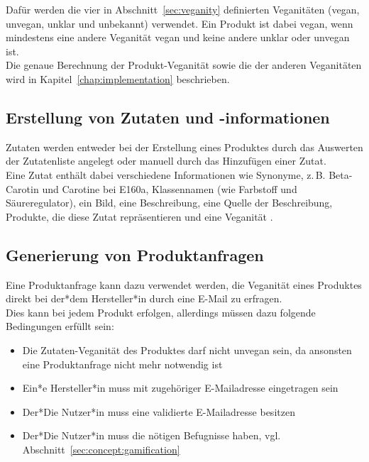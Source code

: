 Dafür werden die vier in Abschnitt~\ref{sec:veganity} definierten Veganitäten 
(vegan, unvegan, unklar und unbekannt) verwendet. Ein Produkt ist dabei vegan, 
wenn mindestens eine andere Veganität vegan und keine andere unklar oder 
unvegan ist.\\
Die genaue Berechnung der Produkt-Veganität sowie die der anderen Veganitäten 
wird in Kapitel~\ref{chap:implementation} beschrieben.

\subsection{Erstellung von Zutaten und -informationen}
\label{sec:concept:ingredients}

Zutaten werden entweder bei der Erstellung eines Produktes durch das
Auswerten der Zutatenliste angelegt oder manuell durch das Hinzufügen
einer Zutat.\\
Eine Zutat enthält dabei verschiedene Informationen wie Synonyme,
z.\,B. Beta-Carotin und Carotine bei E160a,
Klassennamen (wie Farbstoff und Säureregulator), ein Bild, eine
Beschreibung, eine Quelle der Beschreibung, Produkte, die diese Zutat
repräsentieren und eine Veganität .\\

\subsection{Generierung von Produktanfragen}
\label{sec:concept:inquiries}

Eine Produktanfrage kann dazu verwendet werden, die Veganität eines
Produktes direkt bei der*dem Hersteller*in durch eine E-Mail zu erfragen.\\
Dies kann bei jedem Produkt erfolgen, allerdings müssen dazu folgende Bedingungen
erfüllt sein:

\begin{itemize}
  \item Die Zutaten-Veganität des Produktes darf nicht unvegan sein, da ansonsten eine Produktanfrage nicht mehr notwendig ist
  \item Ein*e Hersteller*in muss mit zugehöriger E-Mailadresse eingetragen sein
  \item Der*Die Nutzer*in muss eine validierte E-Mailadresse besitzen 
  \item Der*Die Nutzer*in muss die nötigen Befugnisse haben, vgl. 
Abschnitt~\ref{sec:concept:gamification}
\end{itemize}

